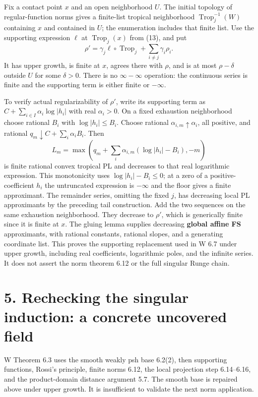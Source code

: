\documentclass[
  11pt,
]{article}
\begin{document}
Fix a contact point \(x\) and an open neighborhood \(U\). The initial
topology of regular-function norms gives a finite-list tropical
neighborhood \(\operatorname{Trop}_j^{-1}(W)\) containing \(x\) and
contained in \(U\); the enumeration includes that finite list. Use the
supporting expression \(\ell\) at \(\operatorname{Trop}_j(x)\) from
(13), and put \[\rho'=\gamma_j\ell\circ\operatorname{Trop}_j
                 +\sum_{i\ne j}\gamma_i\rho_i.\] It has upper growth, is
finite at \(x\), agrees there with \(\rho\), and is at most
\(\rho-\delta\) outside \(U\) for some \(\delta>0\). There is no
\(\infty-\infty\) operation: the continuous series is finite and the
supporting term is either finite or \(-\infty\).

To verify actual regularizability of \(\rho'\), write its supporting
term as \(C+\sum_{i\in I}\alpha_i\log|h_i|\) with real \(\alpha_i>0\).
On a fixed exhaustion neighborhood choose rational \(B_i\) with
\(\log|h_i|\leq B_i\). Choose rational \(\alpha_{i,m}\uparrow\alpha_i\),
all positive, and rational \(q_m\downarrow C+\sum_i\alpha_i B_i\). Then
\[L_m=\max\left(q_m+\sum_i\alpha_{i,m}(\log|h_i|-B_i),-m\right)\] is
finite rational convex tropical PL and decreases to that real
logarithmic expression. This monotonicity uses \(\log|h_i|-B_i\leq0\);
at a zero of a positive-coefficient \(h_i\) the untruncated expression
is \(-\infty\) and the floor gives a finite approximant. The remainder
series, omitting the fixed \(j\), has decreasing local PL approximants
by the preceding tail construction. Add the two sequences on the same
exhaustion neighborhood. They decrease to \(\rho'\), which is
generically finite since it is finite at \(x\). The gluing lemma
supplies decreasing \textbf{global affine FS} approximants, with
rational constants, rational slopes, and a generating coordinate list.
This proves the supporting replacement used in W 6.7 under upper growth,
including real coefficients, logarithmic poles, and the infinite series.
It does not assert the norm theorem 6.12 or the full singular Runge
chain.

\section{5. Rechecking the singular induction: a concrete uncovered
field}\label{rechecking-the-singular-induction-a-concrete-uncovered-field}

W Theorem 6.3 uses the smooth weakly psh base 6.2(2), then supporting
functions, Rossi's principle, finite norms 6.12, the local projection
step 6.14--6.16, and the product-domain distance argument 5.7. The
smooth base is repaired above under upper growth. It is insufficient to
validate the next norm application.
\end{document}
